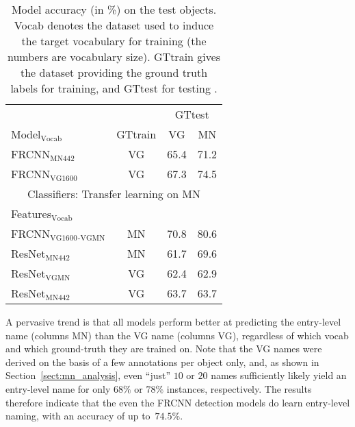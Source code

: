 \begin{table}[t]
	\centering
	\small
	\begin{tabular}{@{~}l@{~}|@{~}c@{~}|cc@{~}}
		\toprule
		&  & \multicolumn{2}{c}{GTtest} \\
		Model$_{\text{Vocab}}$ &  GTtrain &  VG & MN  \\ 
		\midrule
		FRCNN$_{\text{MN442}}$ & VG &  65.4 &      71.2   \\
		FRCNN$_{\text{VG1600}}$ & VG &    67.3 &      74.5 \\
		\midrule \midrule
		\multicolumn{4}{c}{Classifiers: Transfer learning on MN}\\
		Features$_{\text{Vocab}}$ &   \\
		\midrule 
		FRCNN$_{\text{VG1600}}$$_{\text{-VGMN}}$ & MN &    70.8 &      80.6  \\ 
		\midrule
		
		ResNet$_{\text{MN442}}$ & MN &            61.7 &              69.6  \\
		ResNet$_{\text{VGMN}}$  &   VG &  62.4 &              62.9  \\
		ResNet$_{\text{MN442}}$ & VG  &            63.7 &              63.7   \\
		\bottomrule
	\end{tabular}
	\caption{Model accuracy (in \%) on the \mn test objects. Vocab denotes the dataset used to induce the target vocabulary for training (the numbers are vocabulary size). GTtrain gives the dataset providing the ground truth labels for training, and GTtest for testing \label{tab:exp_VGvsMN}.}
	\vspace{0ex}
\end{table}

A pervasive trend is that all models perform better 
at predicting the entry-level name (columns MN) than the VG name (columns VG), regardless of which vocab and which ground-truth they are trained on.  
Note that the VG names were derived on the basis of a few annotations per object only, and, as shown in Section~\ref{sect:mn_analysis}, even ``just'' $10$ or $20$ names sufficiently likely yield an entry-level name for only $68\%$ or $78\%$ instances, respectively. 
The results therefore indicate that the even the FRCNN detection models do learn entry-level naming, with an accuracy of up to~$74.5$\%.

